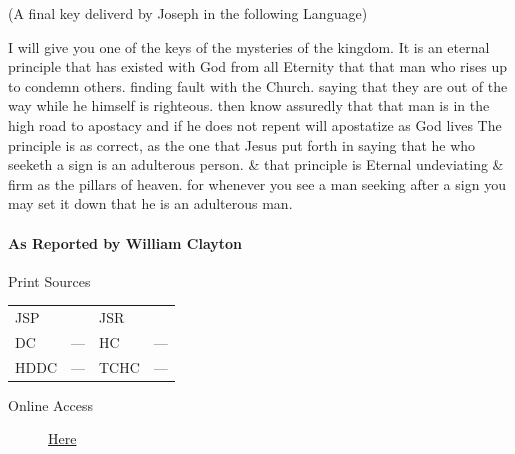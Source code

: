 					\medskip


					(A final key deliverd by Joseph in the following Language)

					I will give you one of the keys of the mysteries of the kingdom. It is an eternal principle that has existed with God from all Eternity that that man who rises up to condemn others. finding fault with the Church. saying that they are out of the way while he himself is righteous. then know assuredly that that man is in the high road to apostacy and if he does not repent will apostatize as God lives The principle is as correct, as the one that Jesus put forth in saying that he who seeketh a sign is an adulterous person. \& that principle is Eternal undeviating \& firm as the pillars of heaven. for whenever you see a man seeking after a sign you may set it down that he is an adulterous man.
					
			\paragraph{As Reported by William Clayton}
				\label{EMS-1839-JS-2-JUL-1839-WC}
				
				\begin{description}
					\item[Print Sources]
				\end{description}

					\begin{tabular}{p{0.5in}p{1in}p{0.5in}p{1in}}
					JSP	 	& 			& JSR 		&  \\
					DC	 	& ---		& HC 		& --- \\
					HDDC 	& ---		& TCHC 		& --- \\
					\end{tabular}
				
				\begin{description}
					\item[Online Access] \href{https://www.josephsmithpapers.org/paper-summary/discourse-2-july-1839-as-reported-by-william-clayton/1}{Here}
				\end{description}
				
